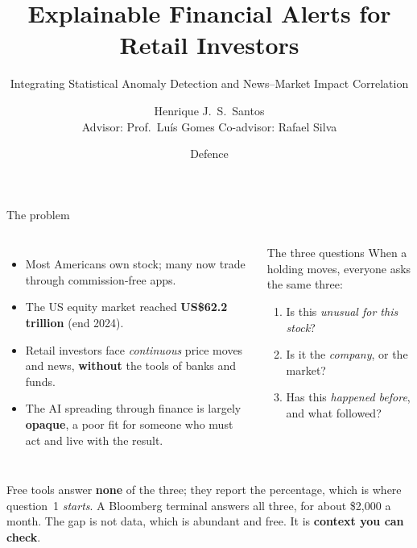 \documentclass[aspectratio=169]{beamer}
\title[InvestiGator]{Explainable Financial Alerts for Retail Investors}
\subtitle{Integrating Statistical Anomaly Detection and News--Market Impact Correlation}
\author[H.\ Santos]{Henrique J.\ S.\ Santos \\ \footnotesize Advisor: Prof.\ Lu\'is Gomes \quad Co-advisor: Rafael Silva}
\institute[ISEP]{MEIA, Instituto Superior de Engenharia do Porto}
\date{\footnotesize Defence}
\begin{document}
\begin{frame}\titlepage\end{frame}

\begin{frame}{The problem}
\begin{columns}
\begin{itemize}
  \item Most Americans own stock; many now trade through commission-free apps.
  \item The US equity market reached \textbf{US\$62.2\,trillion} (end 2024).
  \item Retail investors face \emph{continuous} price moves and news, \textbf{without} the tools of banks and funds.
  \item The AI spreading through finance is largely \textbf{opaque}, a poor fit for someone who must act and live with the result.
\end{itemize}
\begin{block}{The three questions}
\small
When a holding moves, everyone asks the same three:
\begin{enumerate}
  \item Is this \emph{unusual for this stock}?
  \item Is it the \emph{company}, or the market?
  \item Has this \emph{happened before}, and what followed?
\end{enumerate}
\end{block}
\end{columns}
\vfill
{\small Free tools answer \textbf{none} of the three; they report the percentage, which is where
question~1 \emph{starts}. A Bloomberg terminal answers all three, for about \$2{,}000 a month.
The gap is not data, which is abundant and free. It is \textbf{context you can check}.}
\end{frame}
\end{document}
